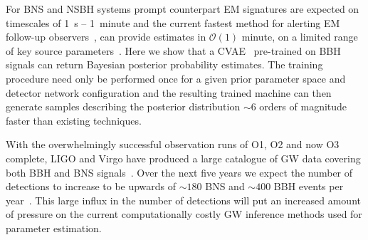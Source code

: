 %
%
For \ac{BNS} and \ac{NSBH} systems prompt counterpart \ac{EM} signatures are expected on timescales of 1~s -- 1~minute and the current fastest method for alerting \ac{EM} follow-up observers~\cite{2016PhRvD..93b4013S}, can provide estimates in $\mathcal{O}(1)$ minute, on a limited range of key source parameters~. 
%
%
Here we show that a \ac{CVAE}~\cite{1904.06264,1812.04405} pre-trained 
on \ac{BBH} signals can return Bayesian posterior probability estimates. 
The training procedure need only be performed once for a given 
prior parameter space and detector network configuration and the 
resulting trained machine can then generate samples describing the 
posterior distribution $\sim 6$ orders of magnitude faster 
than existing techniques.

%
%
%
With the overwhelmingly successful observation runs of O1, O2 and now 
O3 complete, \ac{LIGO} and Virgo have produced a large catalogue of 
\ac{GW} data covering both \ac{BBH} and \ac{BNS} signals~\cite{2010.14527}. 
Over the next five years we expect the number of detections to 
increase to be upwards of $\sim180$ \ac{BNS} and $\sim400$ 
\ac{BBH} events per year~\cite{1304.0670,1811.12907,2018LRR....21....3A}. 
This large influx in the number of detections will put an 
increased amount of pressure on the current computationally 
costly \ac{GW} inference methods used for parameter estimation.  

%
%

